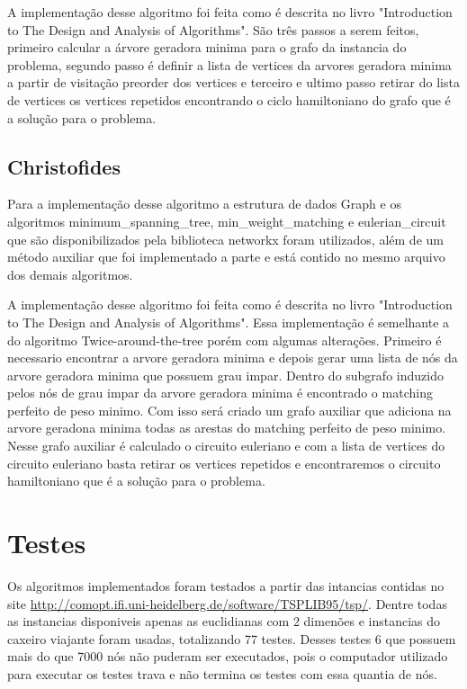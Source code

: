 \documentclass[12pt]{article}
\begin{document}
A implementação desse algoritmo foi feita como é descrita no livro "Introduction to The Design and Analysis of Algorithms". São três passos a serem feitos, primeiro calcular a árvore geradora minima para o grafo da instancia do problema, segundo passo é definir a lista de vertices da arvores geradora minima a partir de visitação preorder dos vertices e terceiro e ultimo passo retirar do lista de vertices os vertices repetidos encontrando o ciclo hamiltoniano do grafo que é a solução para o problema.

\subsection{Christofides}

Para a implementação desse algoritmo a estrutura de dados Graph e os algoritmos minimum\_spanning\_tree, min\_weight\_matching e eulerian\_circuit que são disponibilizados pela biblioteca networkx foram utilizados, além de um método auxiliar que foi implementado a parte e está contido no mesmo arquivo dos demais algoritmos.

A implementação desse algoritmo foi feita como é descrita no livro "Introduction to The Design and Analysis of Algorithms". Essa implementação é semelhante a do algoritmo Twice-around-the-tree porém com algumas alterações. Primeiro é necessario encontrar a arvore geradora minima e depois gerar uma lista de nós da arvore geradora minima que possuem grau impar. Dentro do subgrafo induzido pelos nós de grau impar da arvore geradora minima é encontrado o matching perfeito de peso minimo. Com isso será criado um grafo auxiliar que adiciona na arvore geradona minima todas as arestas do matching perfeito de peso minimo. Nesse grafo auxiliar é calculado o circuito euleriano e com a lista de vertices do circuito euleriano basta retirar os vertices repetidos e encontraremos o circuito hamiltoniano que é a solução para o problema.

\section{Testes}

Os algoritmos implementados foram testados a partir das intancias contidas no site \url{http://comopt.ifi.uni-heidelberg.de/software/TSPLIB95/tsp/}. Dentre todas as instancias disponiveis apenas as euclidianas com 2 dimenões e instancias do caxeiro viajante foram usadas, totalizando 77 testes. Desses testes 6 que possuem mais do que 7000 nós não puderam ser executados, pois o computador utilizado para executar os testes trava e não termina os testes com essa quantia de nós.
\end{document}
